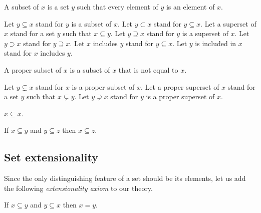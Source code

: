 \documentclass[../../set-theory.tex]{subfiles}
\begin{document}
  \begin{forthel}
    \begin{definition}
      A subset of $x$ is a set $y$ such that every element of $y$ is an element of $x$.
    \end{definition}

    Let $y \subseteq x$ stand for $y$ is a subset of $x$.
    Let $y \subset x$ stand for $y \subseteq x$.
    Let a superset of $x$ stand for a set $y$ such that $x \subseteq y$.
    Let $y \supseteq x$ stand for $y$ is a superset of $x$.
    Let $y \supset x$ stand for $y \supseteq x$.
    Let $x$ includes $y$ stand for $y \subseteq x$.
    Let $y$ is included in $x$ stand for $x$ includes $y$.

    \begin{definition}
      A proper subset of $x$ is a subset of $x$ that is not equal to $x$.
    \end{definition}

    Let $y \subsetneq x$ stand for $x$ is a proper subset of $x$.
    Let a proper superset of $x$ stand for a set $y$ such that $x \subsetneq y$.
    Let $y \supsetneq x$ stand for $y$ is a proper superset of $x$.

    \begin{proposition}\label{SetTheory_01_01_375611}
      $x \subseteq x$.
    \end{proposition}

    \begin{proposition}\label{SetTheory_01_01_726162}
      If $x \subseteq y$ and $y \subseteq z$ then $x \subseteq z$.
    \end{proposition}
  \end{forthel}


  \subsection{Set extensionality}

  \noindent Since the only distinguishing feature of a set should be its
  elements, let us add the following \textit{extensionality axiom} to our
  theory.

  \begin{forthel}
    \begin{axiom}\label{SetTheory_01_01_253735}
      If $x \subseteq y$ and $y \subseteq x$ then $x = y$.
    \end{axiom}
  \end{forthel}
\end{document}
